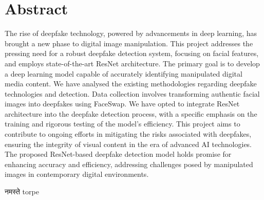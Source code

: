 \chapter*{Abstract}

The rise of deepfake technology, powered by advancements in deep learning, has brought a new phase to digital image manipulation. This project addresses the pressing need for a robust deepfake detection system, focusing on facial features, and employs state-of-the-art ResNet architecture. The primary goal is to develop a deep learning model capable of accurately identifying manipulated digital media content. We have analysed the existing methodologies regarding deepfake technologies and detection. Data collection involves transforming authentic facial images into deepfakes using FaceSwap. We have opted to integrate ResNet architecture into the deepfake detection process, with a specific emphasis on the training and rigorous testing of the model's efficiency. This project aims to contribute to ongoing efforts in mitigating the risks associated with deepfakes, ensuring the integrity of visual content in the era of advanced AI technologies. The proposed ResNet-based deepfake detection model holds promise for enhancing accuracy and efficiency, addressing challenges posed by manipulated images in contemporary digital environments.

 \textsanskrit{नमस्ते}
 \textenglish{torpe}